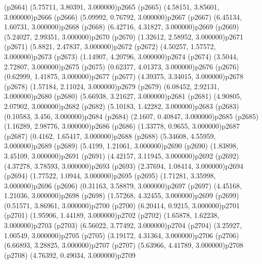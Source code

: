 \psdot(p2664)
\psPoint(5.75711, 3.80391, 3.000000){p2665}
\psdot(p2665)
\psPoint(4.58151, 3.85601, 3.000000){p2666}
\psdot(p2666)
\psPoint(5.09992, 0.76792, 3.000000){p2667}
\psdot(p2667)
\psPoint(6.45134, 1.60731, 3.000000){p2668}
\psdot(p2668)
\psPoint(6.42716, 4.31827, 3.000000){p2669}
\psdot(p2669)
\psPoint(5.24027, 2.99351, 3.000000){p2670}
\psdot(p2670)
\psPoint(1.32612, 2.58952, 3.000000){p2671}
\psdot(p2671)
\psPoint(5.8821, 2.47837, 3.000000){p2672}
\psdot(p2672)
\psPoint(4.50257, 1.57572, 3.000000){p2673}
\psdot(p2673)
\psPoint(1.14907, 4.20796, 3.000000){p2674}
\psdot(p2674)
\psPoint(3.5044, 2.72807, 3.000000){p2675}
\psdot(p2675)
\psPoint(0.62377, 4.01373, 3.000000){p2676}
\psdot(p2676)
\psPoint(0.62999, 1.41875, 3.000000){p2677}
\psdot(p2677)
\psPoint(4.39375, 3.34015, 3.000000){p2678}
\psdot(p2678)
\psPoint(1.57184, 2.11024, 3.000000){p2679}
\psdot(p2679)
\psPoint(6.08452, 2.92131, 3.000000){p2680}
\psdot(p2680)
\psPoint(5.66938, 3.21627, 3.000000){p2681}
\psdot(p2681)
\psPoint(4.90805, 2.07902, 3.000000){p2682}
\psdot(p2682)
\psPoint(5.10183, 1.42282, 3.000000){p2683}
\psdot(p2683)
\psPoint(0.10583, 3.456, 3.000000){p2684}
\psdot(p2684)
\psPoint(2.1607, 0.40847, 3.000000){p2685}
\psdot(p2685)
\psPoint(1.16289, 2.98776, 3.000000){p2686}
\psdot(p2686)
\psPoint(1.33778, 0.9655, 3.000000){p2687}
\psdot(p2687)
\psPoint(0.4162, 1.65417, 3.000000){p2688}
\psdot(p2688)
\psPoint(5.34608, 4.55959, 3.000000){p2689}
\psdot(p2689)
\psPoint(5.4199, 1.21061, 3.000000){p2690}
\psdot(p2690)
\psPoint(1.83898, 3.45109, 3.000000){p2691}
\psdot(p2691)
\psPoint(4.42157, 3.11945, 3.000000){p2692}
\psdot(p2692)
\psPoint(4.37278, 3.78593, 3.000000){p2693}
\psdot(p2693)
\psPoint(2.37694, 1.08414, 3.000000){p2694}
\psdot(p2694)
\psPoint(1.77522, 1.0944, 3.000000){p2695}
\psdot(p2695)
\psPoint(1.71281, 3.35998, 3.000000){p2696}
\psdot(p2696)
\psPoint(0.31163, 3.58879, 3.000000){p2697}
\psdot(p2697)
\psPoint(4.45168, 1.21036, 3.000000){p2698}
\psdot(p2698)
\psPoint(1.57268, 4.32455, 3.000000){p2699}
\psdot(p2699)
\psPoint(0.51571, 3.86961, 3.000000){p2700}
\psdot(p2700)
\psPoint(6.20414, 0.9215, 3.000000){p2701}
\psdot(p2701)
\psPoint(1.95906, 1.44189, 3.000000){p2702}
\psdot(p2702)
\psPoint(1.65878, 1.62238, 3.000000){p2703}
\psdot(p2703)
\psPoint(6.56022, 3.77492, 3.000000){p2704}
\psdot(p2704)
\psPoint(3.25927, 1.00549, 3.000000){p2705}
\psdot(p2705)
\psPoint(3.19172, 4.31364, 3.000000){p2706}
\psdot(p2706)
\psPoint(6.66893, 3.28825, 3.000000){p2707}
\psdot(p2707)
\psPoint(5.63966, 4.41789, 3.000000){p2708}
\psdot(p2708)
\psPoint(4.76392, 0.49034, 3.000000){p2709}
